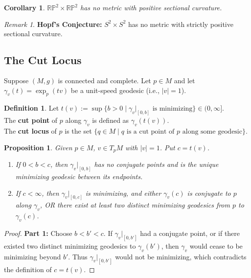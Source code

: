 \documentclass[11pt, a4paper]{article}
\theoremstyle{plain}
\newtheorem{proposition}[theorem]{Proposition}
\newtheorem{corollary}[theorem]{Corollary}
\theoremstyle{definition}
\newtheorem{definition}[theorem]{Definition}
\theoremstyle{remark}
\newtheorem{remark}[theorem]{Remark}
\begin{document}
{\begin{corollary}
$\mathbb{RP}^2 \times \mathbb{RP}^2$ has no metric with positive sectional curvature.
\end{corollary}
\begin{remark}
\textbf{Hopf's Conjecture:} $S^2 \times S^2$ has no metric with strictly positive sectional curvature.
\end{remark}

\newpage

\subsection{The Cut Locus}

Suppose $(M,g)$ is connected and complete. Let $p \in M$ and let $\gamma_v(t) = \exp_p(tv)$ be a unit-speed geodesic (i.e., $|v| = 1$).

\begin{definition}
Let $t(v) := \sup \{ b > 0 \mid \gamma_v|_{[0, b]} \text{ is minimizing} \} \in (0, \infty]$. \\
The \textbf{cut point} of $p$ along $\gamma_v$ is defined as $\gamma_v(t(v))$. \\
The \textbf{cut locus} of $p$ is the set $\{ q \in M \mid q \text{ is a cut point of } p \text{ along some geodesic} \}$.
\end{definition}

\begin{proposition}
Given $p \in M$, $v \in T_p M$ with $|v| = 1$. Put $c = t(v)$.
\begin{enumerate}
    \item If $0 < b < c$, then $\gamma_v|_{[0, b]}$ has no conjugate points and is the unique minimizing geodesic between its endpoints.
    \item If $c < \infty$, then $\gamma_v|_{[0, c]}$ is minimizing, and either $\gamma_v(c)$ is conjugate to $p$ along $\gamma_v$, OR there exist at least two distinct minimizing geodesics from $p$ to $\gamma_v(c)$.
\end{enumerate}
\end{proposition}

\begin{proof}
\textbf{Part 1:} Choose $b < b' < c$. If $\gamma_v|_{[0, b']}$ had a conjugate point, or if there existed two distinct minimizing geodesics to $\gamma_v(b')$, then $\gamma_v$ would cease to be minimizing beyond $b'$. Thus $\gamma_v|_{[0, b']}$ would not be minimizing, which contradicts the definition of $c = t(v)$.


\end{proof}}
\end{document}
